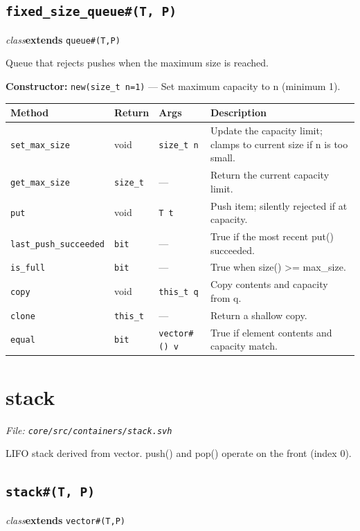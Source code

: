 \documentclass[11pt,letterpaper]{report}
\begin{document}
\subsection*{\texttt{fixed\_size\_queue\#(T, P)}}
\noindent\small\textit{class}\quad \textbf{extends} \texttt{queue\#(T,P)}\par

Queue that rejects pushes when the maximum size is reached.

\noindent\textbf{Constructor:} \texttt{new(size\_t n=1)} --- Set maximum capacity to n (minimum 1).

\begin{xltabular}{\linewidth}{>{\small}p{1.35in} >{\small}p{1.25in} >{\small}p{0.95in} >{\small}X}
\toprule
\textbf{Method} & \textbf{Return} & \textbf{Args} & \textbf{Description} \\
\midrule
\endhead
\bottomrule
\endfoot
\texttt{set\_max\_size} & void & \texttt{size\_t n} & Update the capacity limit; clamps to current size if n is too small. \\
\texttt{get\_max\_size} & \texttt{size\_t} & --- & Return the current capacity limit. \\
\texttt{put} & void & \texttt{T t} & Push item; silently rejected if at capacity. \\
\texttt{last\_push\_succeeded} & \texttt{bit} & --- & True if the most recent put() succeeded. \\
\texttt{is\_full} & \texttt{bit} & --- & True when size() \textgreater{}= max\_size. \\
\texttt{copy} & void & \texttt{this\_t q} & Copy contents and capacity from q. \\
\texttt{clone} & \texttt{this\_t} & --- & Return a shallow copy. \\
\texttt{equal} & \texttt{bit} & \texttt{vector\#() v} & True if element contents and capacity match. \\
\end{xltabular}

\section{stack}
\noindent\small\textit{File: \texttt{core/src/containers/stack.svh}}\par

LIFO stack derived from vector. push() and pop() operate on the front (index 0).

\subsection*{\texttt{stack\#(T, P)}}
\noindent\small\textit{class}\quad \textbf{extends} \texttt{vector\#(T,P)}\par
\end{document}
